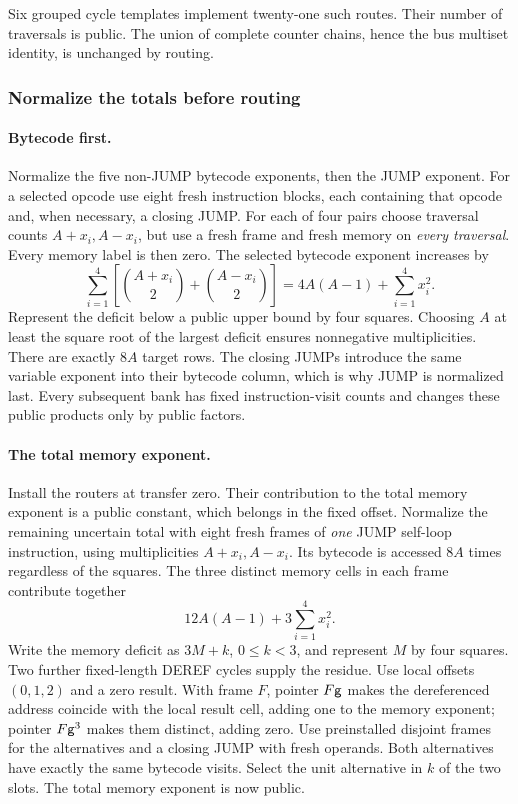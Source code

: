 Six grouped cycle templates implement twenty-one such routes. Their number of traversals is public. The union of complete counter chains, hence the bus multiset identity, is unchanged by routing.

\subsubsection{Normalize the totals before routing}

\paragraph{Bytecode first.} Normalize the five non-JUMP bytecode exponents, then the JUMP exponent. For a selected opcode use eight fresh instruction blocks, each containing that opcode and, when necessary, a closing JUMP. For each of four pairs choose traversal counts $A+x_i,A-x_i$, but use a fresh frame and fresh memory on \emph{every traversal}. Every memory label is then zero. The selected bytecode exponent increases by
\[
 \sum_{i=1}^4\left[\binom{A+x_i}{2}+\binom{A-x_i}{2}\right]
 =4A(A-1)+\sum_{i=1}^4x_i^2.
\]
Represent the deficit below a public upper bound by four squares. Choosing $A$ at least the square root of the largest deficit ensures nonnegative multiplicities. There are exactly $8A$ target rows. The closing JUMPs introduce the same variable exponent into their bytecode column, which is why JUMP is normalized last. Every subsequent bank has fixed instruction-visit counts and changes these public products only by public factors.

\paragraph{The total memory exponent.} Install the routers at transfer zero. Their contribution to the total memory exponent is a public constant, which belongs in the fixed offset. Normalize the remaining uncertain total with eight fresh frames of \emph{one} JUMP self-loop instruction, using multiplicities $A+x_i,A-x_i$. Its bytecode is accessed $8A$ times regardless of the squares. The three distinct memory cells in each frame contribute together
\[
 12A(A-1)+3\sum_{i=1}^4x_i^2.
\]
Write the memory deficit as $3M+k$, $0\le k<3$, and represent $M$ by four squares. Two further fixed-length DEREF cycles supply the residue. Use local offsets $(0,1,2)$ and a zero result. With frame $F$, pointer $F\mathsf{g}$ makes the dereferenced address coincide with the local result cell, adding one to the memory exponent; pointer $F\mathsf{g}^3$ makes them distinct, adding zero. Use preinstalled disjoint frames for the alternatives and a closing JUMP with fresh operands. Both alternatives have exactly the same bytecode visits. Select the unit alternative in $k$ of the two slots. The total memory exponent is now public.

